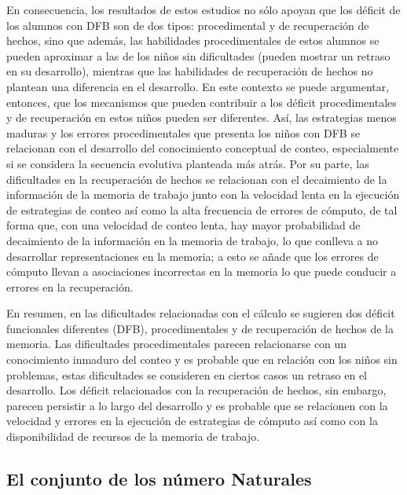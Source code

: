 \documentclass{article}
\begin{document}
En consecuencia, los resultados de estos estudios no sólo apoyan que los déficit de los alumnos con DFB son de dos tipos: procedimental y de recuperación de hechos, sino que además, las habilidades procedimentales de estos alumnos se pueden aproximar a las de los niños sin dificultades (pueden mostrar un retraso en su desarrollo), mientras que las habilidades de recuperación de hechos no plantean una diferencia en el desarrollo.
En este contexto se puede argumentar, entonces, que los mecanismos que pueden contribuir a los déficit procedimentales y de recuperación en estos niños pueden ser diferentes. Así, las estrategias menos maduras y los errores procedimentales que presenta los niños con DFB se relacionan con el desarrollo del conocimiento conceptual de conteo, especialmente si se considera la secuencia evolutiva planteada más atrás. Por su parte, las dificultades en la recuperación de hechos se relacionan con el decaimiento de la información de la memoria de trabajo junto con la velocidad lenta en la ejecución de estrategias de conteo así como la alta frecuencia de errores de cómputo, de tal forma que, con una velocidad de conteo lenta, hay mayor probabilidad de decaimiento de la información en la memoria de trabajo, lo que conlleva a no desarrollar representaciones en la memoria; a esto se añade que los errores de cómputo llevan a asociaciones incorrectas en la memoria lo que puede conducir a errores en la recuperación.

En resumen, en las dificultades relacionadas con el cálculo se sugieren dos déficit funcionales diferentes (DFB), procedimentales y de recuperación de hechos de la memoria. Las dificultades procedimentales parecen relacionarse con un conocimiento inmaduro del conteo y es probable que en relación con los niños sin problemas, estas dificultades se consideren en ciertos casos un retraso en el desarrollo. Los déficit relacionados con la recuperación de hechos, sin embargo, parecen persistir a lo largo del desarrollo y es probable que se relacionen con la velocidad y errores en la ejecución de estrategias de cómputo así como con la disponibilidad de recursos de la memoria de trabajo.

\subsection{El conjunto de los número Naturales}
\end{document}

